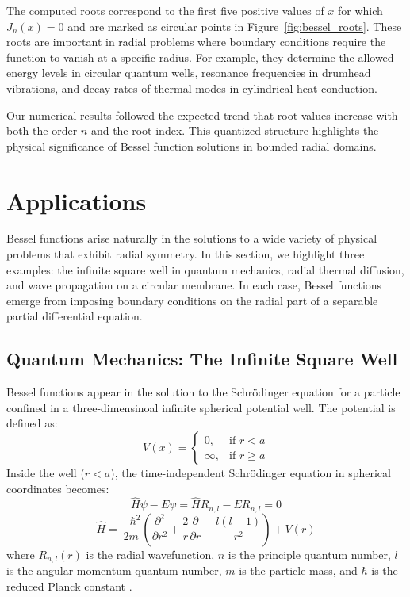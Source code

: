 \documentclass[linenumbers, twocolumn]{aastex631}
\begin{document}
\noindent The computed roots correspond to the first five positive values of $x$
for which $J_n(x)=0$ and are marked as circular points in Figure~\ref{fig:bessel_roots}.
These roots are important in radial problems where boundary conditions require the
function to vanish at a specific radius. For example, they determine the allowed
energy levels in circular quantum wells, resonance frequencies in drumhead 
vibrations, and decay rates of thermal modes in cylindrical heat conduction.

\noindent Our numerical results followed the expected trend that root values
increase with both the order $n$ and the root index. This quantized structure
highlights the physical significance of Bessel function solutions in bounded
radial domains.\\


\section{Applications} \label{sec:applications}

Bessel functions arise naturally in the solutions to a wide variety of physical
problems that exhibit radial symmetry. In this section, we highlight three
examples: the infinite square well in quantum mechanics, radial thermal
diffusion, and wave propagation on a circular membrane. In each case, Bessel
functions emerge from imposing boundary conditions on the radial part of a 
separable partial differential equation.\\

\subsection{Quantum Mechanics: The Infinite Square Well}

Bessel functions appear in the solution to the Schrödinger equation for a
particle confined in a three-dimensinoal infinite spherical potential well.
The potential is defined as:
\begin{equation}
    V(x)=
    \begin{cases}
        0, &\text{if }r < a\\
        \infty, &\text{if }r\geq a
    \end{cases}
\end{equation}
\noindent Inside the well ($r < a$), the time-independent Schrödinger equation in
spherical coordinates becomes:
\begin{equation}
    \hat{H}\psi-E\psi=\hat{H}R_{n,l}-ER_{n,l}=0
\end{equation}
\begin{equation}
    \hat{H}=\frac{-\hbar ^2}{2m}\left(\frac{\partial^2}{\partial r^2} + \frac{2}{r} \frac{\partial}{\partial r} - \frac{l(l+1)}{r^2}\right) +V(r)
\end{equation}
\noindent where $R_{n,l}(r)$ is the radial wavefunction, $n$ is the principle
quantum number, $l$ is the angular momentum quantum number, $m$ is the
particle mass, and $\hbar$ is the reduced Planck constant \citet{hanson}.
\end{document}
